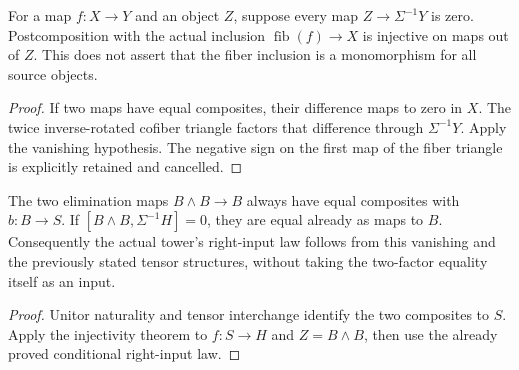 \begin{proposition}
  \label{prop:h6-fiber-mapping-injective}
  \leanok
  For a map $f:X\to Y$ and an object $Z$, suppose every map
  $Z\to\Sigma^{-1}Y$ is zero. Postcomposition with the actual inclusion
  $\operatorname{fib}(f)\to X$ is injective on maps out of $Z$.
  This does not assert that the fiber inclusion is a monomorphism for all
  source objects.
\end{proposition}
\begin{proof}
  If two maps have equal composites, their difference maps to zero in $X$.
  The twice inverse-rotated cofiber triangle factors that difference through
  $\Sigma^{-1}Y$. Apply the vanishing hypothesis. The negative sign on the
  first map of the fiber triangle is explicitly retained and cancelled.
  \leanok
\end{proof}

\begin{proposition}
  \label{prop:h6-unit-fiber-commutes-from-vanishing}
  \leanok
  The two elimination maps $B\wedge B\to B$ always have equal composites
  with $b:B\to S$. If $[B\wedge B,\Sigma^{-1}H]=0$, they are equal
  already as maps to $B$. Consequently the actual tower's right-input law
  follows from this vanishing and the previously stated tensor structures,
  without taking the two-factor equality itself as an input.
\end{proposition}
\begin{proof}
  Unitor naturality and tensor interchange identify the two composites to
  $S$. Apply the injectivity theorem to $f:S\to H$ and $Z=B\wedge B$,
  then use the already proved conditional right-input law.
  \leanok
\end{proof}

